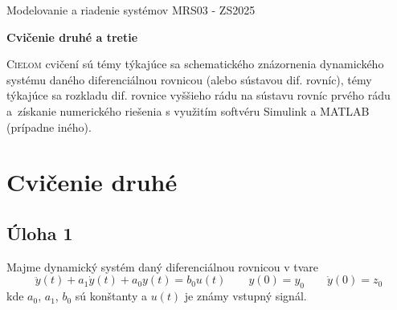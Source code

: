 \documentclass[a4paper, 10pt, ]{article}
\def\oznacenieCasti{MRS03 - ZS2025}
\begin{document}
\lstset{%
style=mystyle,
rangebeginprefix=\#\#\#\ cellB\ ,%
rangebeginsuffix=\ \#\#\#,%
rangeendprefix=\#\#\#\ cellE\ ,%
rangeendsuffix=\ \#\#\#,%
includerangemarker=false,
}






\fontsize{12pt}{22pt}\selectfont

\centerline{\textsf{Modelovanie a riadenie systémov} \hfill \textsf{\oznacenieCasti}}

\fontsize{18pt}{22pt}\selectfont





\begin{flushleft}
	\textbf{\textsf{Cvičenie druhé a tretie}}
\end{flushleft}






\normalsize

\bigskip

{\hypersetup{hidelinks}

\tableofcontents

}

\bigskip

\vspace{18pt}



\noindent
\lettrine[lines=3, nindent=0pt]{C}{ieľom} cvičení sú témy týkajúce sa schematického znázornenia dynamického systému daného diferenciálnou rovnicou (alebo sústavou dif. rovníc), témy týkajúce sa rozkladu dif. rovnice vyššieho rádu na sústavu rovníc prvého rádu a~získanie numerického riešenia s využitím softvéru Simulink a MATLAB (prípadne iného).














\section{Cvičenie druhé} 




\subsection{Úloha 1} \label{cv2u1}

Majme dynamický systém daný diferenciálnou rovnicou v tvare
\begin{equation} \label{eq:DR2R}
    \ddot y(t) + a_1 \dot y(t) + a_0 y(t) = b_0 u(t) \qquad y(0) = y_0 \qquad \dot y(0) = z_0
\end{equation}
kde $a_0$, $a_1$, $b_0$ sú konštanty a $u(t)$ je známy vstupný signál.
\end{document}
